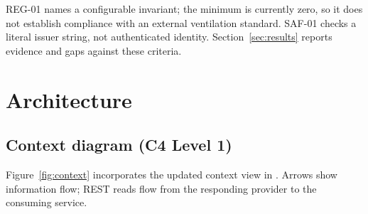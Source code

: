 \documentclass[11pt,a4paper]{article}
\begin{document}
REG-01 names a configurable invariant; the minimum is currently zero, so it does not establish compliance with an external ventilation standard. SAF-01 checks a literal issuer string, not authenticated identity. Section~\ref{sec:results} reports evidence and gaps against these criteria.

\section{Architecture}
\subsection{Context diagram (C4 Level 1)}
Figure~\ref{fig:context} incorporates the updated context view in . Arrows show information flow; REST reads flow from the responding provider to the consuming service.
\end{document}
